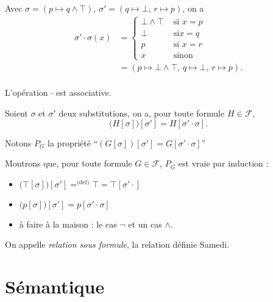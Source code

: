 \begin{exm}
	Avec $\sigma = ( p \mapsto q \land \top )$, $\sigma' = (q \mapsto \bot,\,r \mapsto p)$, on a
	\begin{align*}
		\sigma' \cdot \sigma (x) &= \begin{cases}
			\bot \land \top &\text{ si } x = p\\
			\bot &\text{ si} x = q\\
			p &\text{ si } x = r\\
			x &\text{ sinon}
		\end{cases}\\
		&= (p\mapsto \bot \land \top,\,q\mapsto \bot,\, r \mapsto p). \\
	\end{align*}
\end{exm}

\begin{rmk}
	L'opération $\cdot$\/ est associative.
\end{rmk}

\begin{prop}
	Soient $\sigma$\/ et $\sigma'$\/ deux substitutions, on a, pour toute formule $H \in \mathcal{F}$, \[
		\big(H[\sigma]\big)[\sigma'] = H[\sigma' \cdot \sigma]
	.\]
\end{prop}

\begin{prv}
	Notons $P_G$\/ la propriété \hfill ``$(G[\sigma])[\sigma'] = G[\sigma' \cdot \sigma]$\/'' \hfill\hbox{}

	Montrons que, pour toute formule $G \in \mathcal{F}$, $P_G$\/ est vraie par induction : 
	\begin{itemize}
		\item $\big(\top[\sigma]\big)[\sigma'] \mathrel{\mathop=^{\text{(def)}}} \top = \top[\sigma' \cdot]$\/
		\item $\big(p[\sigma]\big)[\sigma'] = p[\sigma' \cdot \sigma]$\/ 
		\item à faire à la maison : le cas $\lnot $\/ et un cas $\land$.
	\end{itemize}
\end{prv}

\begin{defn}
	On appelle {\it relation sous formule}, la relation définie Samedi.

\end{defn}

\section{Sémantique}


